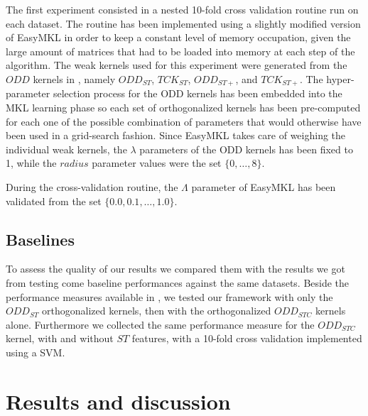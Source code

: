 The first experiment consisted in a nested 10-fold cross validation routine run
on each dataset.
The routine has been implemented using a slightly modified version of EasyMKL
\cite{easymkl} in order to keep a constant level of memory occupation,
given the large amount of matrices that had to be loaded into memory at each
step of the algorithm.
The weak kernels used for this experiment were generated from the $ODD$ kernels
in \cite{rtesselli}, namely $ODD_{ST}$, $TCK_{ST}$, $ODD_{ST+}$, and $TCK_{ST+}$.
The hyper-parameter selection process for the ODD kernels has been embedded
into the MKL learning phase so each set of orthogonalized kernels has been
pre-computed for each one of the possible combination of parameters that would
otherwise have been used in a grid-search fashion.
Since EasyMKL takes care of weighing the individual weak kernels, the $\lambda$
parameters of the ODD kernels has been fixed to 1, while the $radius$ parameter
values were the set $\{0,\dots,8\}$.

During the cross-validation routine, the $\Lambda$ parameter of EasyMKL has been
validated from the set $\{0.0, 0.1,\dots,1.0\}$.

\subsection{Baselines}
To assess the quality of our results we compared them with the results we got
from testing come baseline performances against the same datasets.
Beside the performance measures available in \cite{gmkl}, we tested our framework
with only the $ODD_{ST}$ orthogonalized kernels, then with the orthogonalized
$ODD_{STC}$ kernels alone.
Furthermore we collected the same performance measure for the $ODD_{STC}$ kernel,
with and without $ST$ features, with a 10-fold cross validation implemented
using a SVM.


\section{Results and discussion}
\label{subsec:results}

